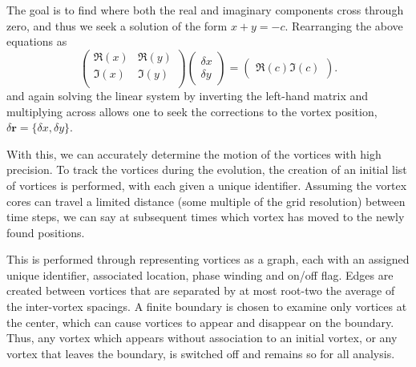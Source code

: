 The goal is to find where both the real and imaginary components cross through zero, and thus we seek a solution of the form $x + y = -c$. Rearranging the above equations as
\begin{equation}\left(
    \begin{array}{cc}
        \Re(x) & \Re(y) \\
        \Im(x) & \Im(y) \\
    \end{array}\right)
    \left(
    \begin{array}{c}
        \delta x \\
        \delta y
    \end{array}\right)
    =
    \left(
    \begin{array}{c}
        \Re(c)
        \Im(c)
    \end{array}\right).
\end{equation}
and again solving the linear system by inverting the left-hand matrix and multiplying across allows one to seek the corrections to the vortex position, $\delta \mathbf{r} = \{\delta x, \delta y \}$.

 With this, we can accurately determine the motion of the vortices with high precision. To track the vortices during the evolution, the creation of an initial list of vortices is performed, with each given a unique identifier. Assuming the vortex cores can travel a limited distance (some multiple of the grid resolution) between time steps, we can say at subsequent times which vortex has moved to the newly found positions.

 This is performed through representing vortices as a graph, each with an assigned unique identifier, associated location, phase winding and on/off flag. Edges are created between vortices that are separated by at most root-two the average of the inter-vortex spacings. A finite boundary is chosen to examine only vortices at the center, which can cause vortices to appear and disappear on the boundary. Thus, any vortex which appears without association to an initial vortex, or any vortex that leaves the boundary, is switched off and remains so for all analysis.
